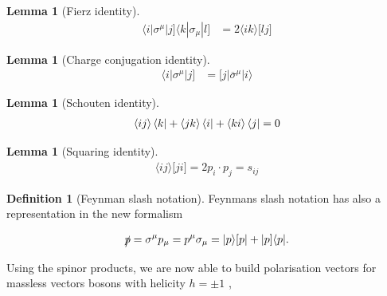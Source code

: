 \documentclass{article}
\theoremstyle{definition}
\newtheorem{definition}{Definition}[section]
\newtheorem{lemma}[theorem]{Lemma}
\numberwithin{equation}{section}
\begin{document}
\begin{lemma}[Fierz identity]

\begin{align}
    \langle i | \sigma^{\mu} | j \rbrack \langle k | \sigma_{\mu} | l \rbrack &= 2 \langle ik \rangle \lbrack lj \rbrack \label{eq:fierz} 
\end{align}

\end{lemma}

\begin{lemma}[Charge conjugation identity]

\begin{align}
    \langle i | \sigma^{\mu} | j \rbrack &= \lbrack j | \overline{\sigma}^{\mu} | i \rangle \label{eq:ijji}
\end{align}

\end{lemma}

\begin{lemma}[Schouten identity]

\begin{align}
    \langle ij \rangle \bra{k} + \langle jk \rangle \bra{i} + \langle ki \rangle \bra{j} = 0 \label{eq:schouten}
\end{align}

\end{lemma}

\begin{lemma}[Squaring identity]

\begin{align}
     \langle ij \rangle \lbrack ji \rbrack = 2 p_i \cdot p_j = s_{ij} \label{eq:ij}
\end{align}

\end{lemma}

\begin{definition}[Feynman slash notation]

Feynmans slash notation has also a representation in the new formalism

\begin{align}
     \slashed{p} = \sigma^{\mu} p_{\mu} = p^{\mu} \sigma_{\mu} = | p \rangle \lbrack p | + | p \rbrack \langle p |. \label{eq:slash}
\end{align}

\end{definition}

Using the spinor products, we are now able to build polarisation vectors for massless vectors bosons with helicity $h=\pm1$ \cite{xu86},
\end{document}

